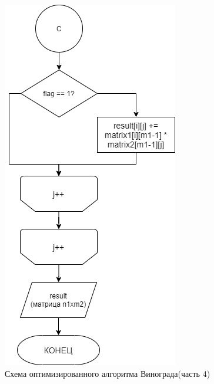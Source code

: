\documentclass[12pt]{report}
\begin{document}
\newpage 

\begin{figure}[h]
	\centering
	\includegraphics[width=0.4\linewidth]{vinopt4.jpg}
	\caption{Схема оптимизированного алгоритма Винограда(часть 4)}
	\label{fig:vinOpt4}
\end{figure}

\newpage
\end{document}
